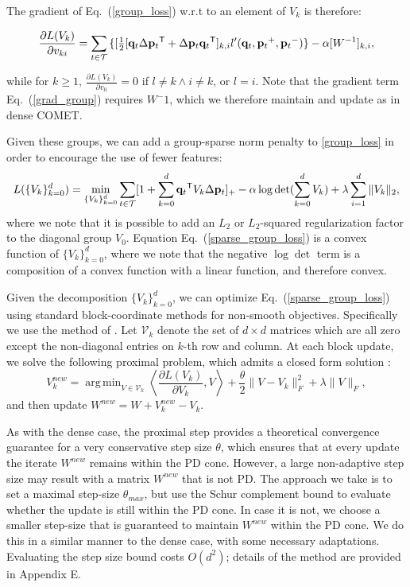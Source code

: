 \documentclass[twoside,11pt]{article}
\newcommand\mat[1]{{#1}}
\renewcommand\vec[1]{\mathbf{#1}}
\newcommand{\T}{{}^\mathsf{T}}
\newcommand{\W}{\mat{W}}
\newcommand{\q}{{\vec{q}}}
\newcommand{\p}{{\vec{p}}}
\newcommand{\trip}{{t}}
\newcommand{\qt}{{\q_{\trip}}}
\newcommand{\pt}{{\p_{\trip}}}
\newcommand{\triplet}{(\qt, \pt^{+}, \pt^{-})}
\newcommand{\Vk}{\mat{V_k}}
\newcommand{\Vg}{\{\Vk\}_{k=0}^{d}} %
\renewcommand{\eqref}[1]{Eq.~(\ref{#1})}
\DeclareMathOperator*{\argmin}{arg\,min}
\begin{document}
The gradient of \eqref{group_loss} w.r.t to an element of $\mat{V}_k$ is therefore:

\begin{equation}
  \frac{\partial {L (V_k)}}{\partial v_{ki}} = \sum\limits_{t\in \cal{T}}{\{
  [\tfrac{1}{2}[\q_{t}\Delta\p_{t}\T + \Delta\p_{t}\q_{t}\T]_{k,i}  }
  {l'}\triplet\} - \alpha [\W^{-1}]_{k,i},
  \label{grad_group}
\end{equation}

while for $k \geq 1$, $\frac{\partial {L (V_k)}}{\partial v_{li}}=0$ if  $l \neq k \wedge i \neq k$, or $l=i$. Note that the gradient term \eqref{grad_group} requires $\W^-1$, which we therefore maintain and update as in dense COMET.

Given these groups, we can add a group-sparse norm penalty to  \ref{group_loss} in order to encourage the use of fewer features:
\begin{equation}
L(\Vg) = 
  \min_{\Vg} \sum_{\trip \in \cal{T}}  [1+\sum_{k=0}^{d}{\qt\T \Vk\Delta \vec{p}_t } ]_{+} - \alpha \log \det(\sum_{k=0}^{d}{\Vk}) + \lambda \sum_{i=1}^d \|V_k\|_2,
  \label{sparse_group_loss}
\end{equation} 
where we note that it is possible to add an $L_2$ or $L_2$-squared regularization factor to the diagonal group $V_0$. Equation \eqref{sparse_group_loss} is a convex function of $\Vg$, where we note that the negative $\log \det$ term is a composition of a convex function with a linear function, and therefore convex.

Given the decomposition $\Vg$, we can optimize \eqref{sparse_group_loss} using standard block-coordinate methods for non-smooth objectives. Specifically we use the method of \citet{richtarik2014iteration}. Let $\mathcal{V}_k$ denote the set of $d \times d$ matrices which are all zero except the non-diagonal entries on $k$-th row and column. At each block update, we solve the following proximal problem, which admits a closed form solution \citep{bach2012optimization}:
\begin{equation}\label{eq:prox}
V_k^{new} = \argmin_{\mat{V} \in \mathcal{V}_k} \left\langle \frac{\partial{L (V_k)}}{\partial V_k}, \mat{V} \right\rangle + \frac{\theta}{2}\|V - V_k\|_F^2 + \lambda \|V\|_F,
\end{equation}
and then update $\W^{new} = \W + V_k^{new} - V_k$.

As with the dense case, the proximal step provides a theoretical convergence guarantee for a very conservative step size $\theta$, which ensures that at every update the iterate $\W^{new}$ remains within the PD cone.
However, a large non-adaptive step size may result with a matrix $\W^{new}$ that is not PD. The approach we take is to set a maximal step-size $\theta_{max}$, but use the Schur complement bound to evaluate whether the update is still within the PD cone. In case it is not, we choose a smaller step-size that is guaranteed to maintain $W^{new}$ within the PD cone. We do this in a similar manner to the dense case, with some necessary adaptations. Evaluating the step size bound costs $O(d^2)$; details of the method are provided in Appendix E. 
\end{document}
